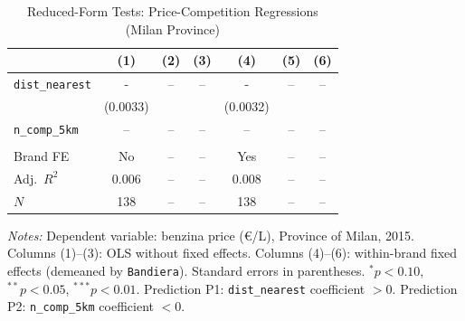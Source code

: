 \begin{table}[htbp]
\centering
\caption{Reduced-Form Tests: Price-Competition Regressions (Milan Province)}
\label{tab:rf_milan}
\begin{tabular}{lcccccc}
\hline\hline
& (1) & (2) & (3) & (4) & (5) & (6) \\
\hline
\texttt{dist\_nearest} & - & -- & -- & - & -- & -- \\
 & (0.0033) &  &  & (0.0032) &  &  \\
\texttt{n\_comp\_5km} & -- & -- & -- & -- & -- & -- \\
 &  &  &  &  &  &  \\
\hline
Brand FE & No & -- & -- & Yes & -- & -- \\
Adj.\ $R^2$ & 0.006 & -- & -- & 0.008 & -- & -- \\
$N$ & 138 & -- & -- & 138 & -- & -- \\
\hline\hline
\end{tabular}
\begin{tablenotes}
\small
\item \textit{Notes:} Dependent variable: benzina price (€/L), Province of Milan, 2015.
Columns (1)--(3): OLS without fixed effects.
Columns (4)--(6): within-brand fixed effects (demeaned by \texttt{Bandiera}).
Standard errors in parentheses. $^{*}p<0.10$, $^{**}p<0.05$, $^{***}p<0.01$.
Prediction P1: \texttt{dist\_nearest} coefficient $>0$.
Prediction P2: \texttt{n\_comp\_5km} coefficient $<0$.
\end{tablenotes}
\end{table}

